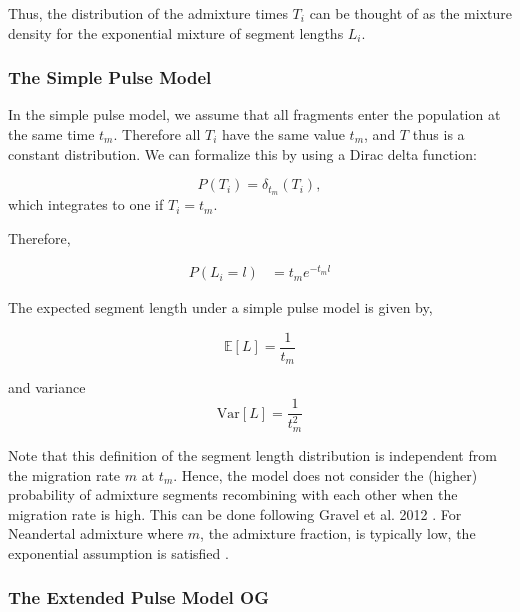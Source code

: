 \documentclass[]{article}
\begin{document}
Thus, the distribution of the admixture times $T_i$ can be thought of as the mixture density for the exponential mixture of segment lengths $L_i$. 

\subsubsection{The Simple Pulse Model}\label{The Simple Pulse Model}


In the simple pulse model, we assume that all fragments enter the population at the same time $t_m$. Therefore all $T_i$ have the same value $t_m$, and $T$ thus is a constant distribution. We can formalize this by using a Dirac delta function:

\begin{equation}
\label{eq:RV_simple_pulse}
  P(T_i)=\delta_{t_m}(T_i),
\end{equation} 
which integrates to one if $T_i = t_m$.


Therefore,

\begin{equation}
\begin{split}
\label{eq:Likelihood_function_simple_pulse}
    P(L_i=l) &= t_me^{-t_m l}
\end{split}
\end{equation}

The expected segment length under a simple pulse model is given by,

\begin{equation}
\label{eq:Expected_l_simple_pulse}
    \mathbb{E}[L]=\frac{1}{t_m}
\end{equation}

and variance
\begin{equation}
\label{eq:Expected_l_simple_pulse}
    \text{Var}[L]=\frac{1}{t_m^2}
\end{equation}


Note that this definition of the segment length distribution is independent from the migration rate $m$ at $t_m$. Hence, the model does not consider the (higher) probability of admixture segments recombining with each other when the migration rate is high. This can be done following Gravel et al. 2012 \citep{gravel_population_2012}. For Neandertal admixture where $m$, the admixture fraction, is typically low, the exponential assumption is satisfied \citep{liang_lengths_2014}.

\subsubsection{The Extended Pulse Model OG}\label{The Extended Pulse Model}
\end{document}
